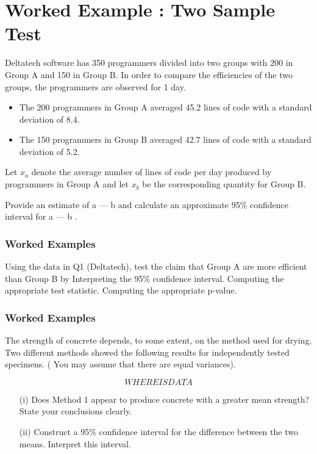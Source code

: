 ﻿\documentclass[]{report}
\begin{document}
\section{Worked Example : Two Sample Test} Deltatech software has 350 programmers divided into two groups with 200 in Group A and 150 in Group B. In order to compare the efficiencies of the two groups, the programmers are observed for  1 day.

\begin{itemize}
\item  The 200 programmers in Group A averaged 45.2 lines of code with a standard deviation of 8.4.

\item The 150 programmers in Group B averaged 42.7 lines of code with a standard deviation of 5.2.

\end{itemize}


Let $x_a$ denote the average number of lines of code per day produced by programmers in Group A and
let $x_b$ be the corresponding quantity for Group B.

Provide an estimate of a — b and calculate an approximate 95\% confidence interval for a — b .


\subsubsection{Worked Examples} 
 Using the data in Q1 (Deltatech), test the claim that Group A are more efficient than Group B by
Interpreting the 95\% confidence interval.
Computing the appropriate test statistic.
Computing the appropriate p-value.



\subsubsection{Worked Examples} 

The strength of concrete depends, to some extent, on the method used for drying. Two different methods showed the following results for independently tested specimens.  ( You may assume that there are equal variances).

\[ WHERE IS DATA \]


\begin{itemize}
\item[(i)] Does Method 1 appear to produce concrete with a greater mean strength? State your conclusions clearly.
\item[(ii)]Construct a 95\% confidence interval for the difference between the two means. Interpret this interval.

\end{itemize}
\end{document}
